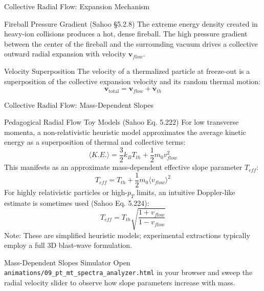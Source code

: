 \documentclass[aspectratio=169]{beamer}
\begin{document}
\begin{frame}{Collective Radial Flow: Expansion Mechanism}
    \begin{block}{Fireball Pressure Gradient (Sahoo §5.2.8)}
        The extreme energy density created in heavy-ion collisions produces a hot, dense fireball. The high pressure gradient between the center of the fireball and the surrounding vacuum drives a collective outward radial expansion with velocity $\mathbf{v}_{flow}$.
    \end{block}
    \begin{block}{Velocity Superposition}
        The velocity of a thermalized particle at freeze-out is a superposition of the collective expansion velocity and its random thermal motion:
        \[ \mathbf{v}_{\mathrm{total}} = \mathbf{v}_{flow} + \mathbf{v}_{th} \]
    \end{block}
\end{frame}

\begin{frame}{Collective Radial Flow: Mass-Dependent Slopes}
    \begin{block}{Pedagogical Radial Flow Toy Models (Sahoo Eq. 5.222)}
        For low transverse momenta, a non-relativistic heuristic model approximates the average kinetic energy as a superposition of thermal and collective terms:
        \[ \langle K.E. \rangle = \frac{3}{2} k_B T_{th} + \frac{1}{2} m_0 v_{flow}^2 \]
        This manifests as an approximate mass-dependent effective slope parameter $T_{eff}$:
        \[ T_{eff} = T_{th} + \frac{1}{2} m_0 \langle v_{flow} \rangle^2 \]
        For highly relativistic particles or high-$p_T$ limits, an intuitive Doppler-like estimate is sometimes used (Sahoo Eq. 5.224):
        \[ T_{eff} = T_{th} \sqrt{\frac{1 + v_{flow}}{1 - v_{flow}}} \]
        Note: These are simplified heuristic models; experimental extractions typically employ a full 3D blast-wave formulation.
    \end{block}
    \begin{alertblock}{Mass-Dependent Slopes Simulator}
        Open \texttt{animations/09\_pt\_mt\_spectra\_analyzer.html} in your browser and sweep the radial velocity slider to observe how slope parameters increase with mass.
    \end{alertblock}
\end{frame}
\end{document}
